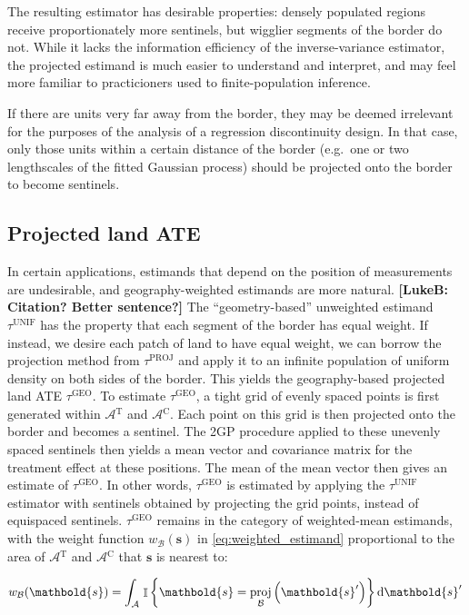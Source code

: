 \documentclass[letter]{article}
\DeclareMathOperator{\Ind}{\mathbb{I}}
\newcommand{\area}{\mathcal{A}}
\newcommand{\treat}{\mathrm{T}}
\newcommand{\ctrol}{\mathrm{C}}
\newcommand{\treatarea}{\area{}^{\treat}}
\newcommand{\ctrolarea}{\area{}^{\ctrol}}
\newcommand{\svec}{\mathbold{s}}
\newcommand{\border}{\mathcal{B}}
\newcommand{\unifavg}{\tau^{\mathrm{UNIF}}}
\newcommand{\tauproj}{\tau^{\mathrm{PROJ}}}
\newcommand{\taugeo}{\tau^{\mathrm{GEO}}}
\DeclareMathOperator{\proj}{proj}
\newcommand{\weightb}{w_{\border}}
\begin{document}
The resulting estimator has desirable properties: densely populated regions receive proportionately more sentinels, but wigglier segments of the border do not.
While it lacks the information efficiency of the inverse-variance estimator,
the projected estimand is much easier to understand and interpret,
and may feel more familiar to practicioners used to finite-population inference.

If there are units very far away from the border,
they may be deemed irrelevant for the purposes of the analysis of a regression discontinuity design. In that case, only those units within a certain distance of the border (e.g.~one or two lengthscales of the fitted Gaussian process) should be projected onto the border to become sentinels.
    


    	\subsection{Projected land ATE}\label{projected-land-ate}

In certain applications, estimands that depend on the position of measurements are undesirable, and geography-weighted estimands are more natural. \textbf{{[}LukeB: Citation? Better sentence?{]}}
The ``geometry-based'' unweighted estimand \(\unifavg\) has the property that each segment of the border has equal weight.
If instead, we desire each patch of land to have equal weight, we can borrow the projection method from \(\tauproj\) and apply it to an infinite population of uniform density on both sides of the border.
This yields the geography-based projected land ATE \(\taugeo\).
To estimate \(\taugeo\), a tight grid of evenly spaced points is first generated within \(\treatarea\) and \(\ctrolarea\).
Each point on this grid is then projected onto the border and becomes a sentinel.
The 2GP procedure applied to these unevenly spaced sentinels then yields a mean vector and covariance matrix for the treatment effect at these positions.
The mean of the mean vector then gives an estimate of \(\taugeo\).
In other words, \(\taugeo\) is estimated by applying the \(\unifavg\) estimator with sentinels obtained by projecting the grid points, instead of equispaced sentinels.
\(\taugeo\) remains in the category of weighted-mean estimands, with the weight function \(\weightb(\svec)\) in \eqref{eq:weighted_estimand} proportional to the area of \(\treatarea\) and \(\ctrolarea\) that \(\svec\) is nearest to:

\begin{equation}
\weightb(\svec) = \int_{\area} \left. \Ind \cbr{\svec = \proj_{\border}\del{\svec'}} \dif \svec' \right.
\end{equation}
\end{document}
